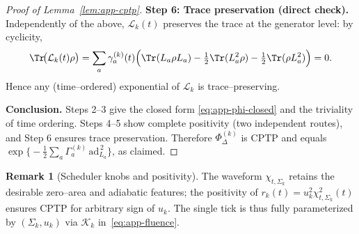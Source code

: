 \documentclass[10pt]{article}
\theoremstyle{definition}
\newtheorem{remark}{Remark}[section]
\theoremstyle{plain}
\begin{document}
\begin{proof}[Proof of Lemma~\ref{lem:app-cptp}]
\medskip
\noindent\textbf{Step 6: Trace preservation (direct check).}
Independently of the above, \(\mathcal L_k(t)\) preserves the trace at the generator level:
by cyclicity,
\[
\Tr\!\big(\mathcal L_k(t)\rho\big)=\sum_a \gamma_a^{(k)}(t)\Big(\Tr(L_a\rho L_a)
-\tfrac12\Tr(L_a^2\rho)-\tfrac12\Tr(\rho L_a^2)\Big)=0.
\]
Hence any (time–ordered) exponential of \(\mathcal L_k\) is trace–preserving.

\medskip
\noindent\textbf{Conclusion.}
Steps 2–3 give the closed form \eqref{eq:app-phi-closed} and the triviality of time ordering.
Steps 4–5 show complete positivity (two independent routes), and Step 6 ensures trace preservation.
Therefore \(\Phi_\Delta^{(k)}\) is CPTP and equals
\(\exp\!\big\{-\tfrac12\sum_a \Gamma_a^{(k)}\,\mathrm{ad}_{L_a}^{\,2}\big\}\),
as claimed.
\end{proof}

\begin{remark}[Scheduler knobs and positivity]
\label{rem:app-knobs}
The waveform \(\chi_{t,\Sigma_k}\) retains the desirable zero–area and adiabatic features; the positivity of
\(r_k(t)=u_k^2\chi_{t,\Sigma_k}^2(t)\) ensures CPTP for arbitrary sign of \(u_k\).
The single tick is thus fully parameterized by \((\Sigma_k,u_k)\) via \(\mathcal K_k\) in~\eqref{eq:app-fluence}.
\end{remark}
\end{document}
